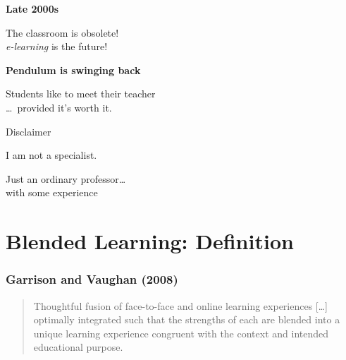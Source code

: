 \begin{frame}
  \begin{center}
    \textbf{Late 2000s}
  \end{center}
  \begin{center}
    The classroom is obsolete! \\
    \emph{e-learning} is the future!
  \end{center}
\end{frame}

\begin{frame}
  \begin{center}
    \textbf{Pendulum is swinging back}
  \end{center}
  \begin{center}
    Students like to meet their teacher \\
    \pause
    \dots\ provided it's worth it.
  \end{center}
\end{frame}

\begin{frame}[standout]
  Disclaimer \\
  \bigskip

  I am not a specialist.

  Just an ordinary professor\dots \\
  with some experience
\end{frame}

\section{Blended Learning: Definition}

\begin{frame}
  \frametitle{Garrison and Vaughan (2008)}

  \begin{quote}
    Thoughtful fusion of face-to-face and online learning experiences
    [\dots] optimally integrated such that \alert{the strengths of
      each} are blended into a unique learning experience congruent
    with the context and intended educational purpose.
  \end{quote}
\end{frame}

